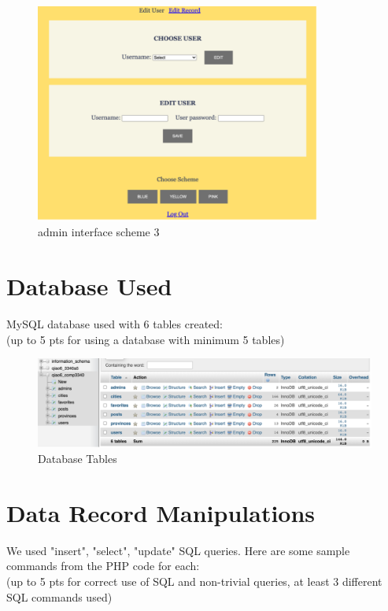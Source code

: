 \documentclass[12pt, letterpaper]{article}
\begin{document}
 \newpage

\begin{figure}[htbp]
	\centering
	\includegraphics[width=3.7in]{images/q14-6.png}
	\caption{admin interface scheme 3}
 \end{figure}
 \newpage

\section{Database Used}
MySQL database used with 6 tables created:
\\(up to 5 pts for using a database with minimum 5 tables)

\begin{figure}[htbp]
	\centering
	\includegraphics[width=6in]{images/q15.png}
	\caption{Database Tables}
 \end{figure}

 \newpage

\section{Data Record Manipulations}
We used "insert", "select", "update" SQL queries. 
Here are some sample commands from the PHP code for each:
\\(up to 5 pts for correct use of SQL and non-trivial queries, at least 3 different SQL commands used)
\end{document}
